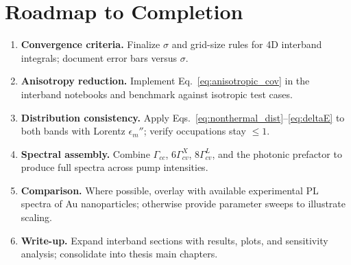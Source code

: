 \section{Roadmap to Completion}
\begin{enumerate}
  \item \textbf{Convergence criteria.} Finalize $\sigma$ and grid-size rules for 4D interband integrals; document error bars versus $\sigma$.
  \item \textbf{Anisotropy reduction.} Implement Eq.~\eqref{eq:anisotropic_cov} in the interband notebooks and benchmark against isotropic test cases.
  \item \textbf{Distribution consistency.} Apply Eqs.~\eqref{eq:nonthermal_dist}--\eqref{eq:deltaE} to both bands with Lorentz $\epsilon_{m}''$; verify occupations stay $\leq 1$.
  \item \textbf{Spectral assembly.} Combine $\Gamma_{cc}$, $6\Gamma^{X}_{cv}$, $8\Gamma^{L}_{cv}$, and the photonic prefactor to produce full spectra across pump intensities.
  \item \textbf{Comparison.} Where possible, overlay with available experimental PL spectra of Au nanoparticles; otherwise provide parameter sweeps to illustrate scaling.
  \item \textbf{Write-up.} Expand interband sections with results, plots, and sensitivity analysis; consolidate into thesis main chapters.
\end{enumerate}
